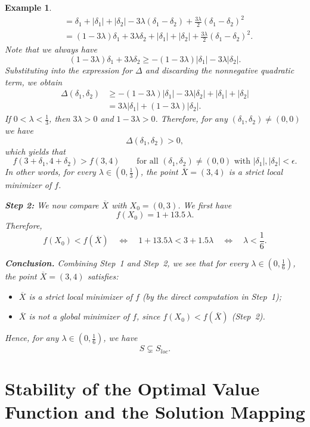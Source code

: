\documentclass[11pt]{article}
\newtheorem{example}[theorem]{Example}
\theoremstyle{definition}
\newcommand{\1}{\mathbf{1}}
\def\Bar{\overline}
\begin{document}
\begin{example}
{\[\begin{aligned}
&=\delta_1 + |\delta_1| + |\delta_2|
-3\lambda(\delta_1-\delta_2)
+\frac{3\lambda}{2}(\delta_1-\delta_2)^2\\
&=(1-3\lambda)\delta_1 + 3\lambda\delta_2
+|\delta_1|+|\delta_2|
+\frac{3\lambda}{2}(\delta_1-\delta_2)^2.
\end{aligned}\]
Note that we always have
\[
(1-3\lambda)\delta_1 + 3\lambda\delta_2
\ge
-(1-3\lambda)|\delta_1| - 3\lambda|\delta_2|.
\]
Substituting into the expression for $\Delta$ and discarding the nonnegative
quadratic term, we obtain
\[
\begin{aligned}
\Delta(\delta_1,\delta_2)
&\ge
-(1-3\lambda)|\delta_1| - 3\lambda|\delta_2|
+|\delta_1|+|\delta_2|\\
&=
3\lambda|\delta_1| + (1-3\lambda)|\delta_2|.
\end{aligned}
\]
If $0<\lambda<\tfrac13$, then $3\lambda>0$ and $1-3\lambda>0$. Therefore,
for any $(\delta_1,\delta_2)\ne(0,0)$ we have
\[
\Delta(\delta_1,\delta_2)>0,
\]
which yields that
\[
f(3+\delta_1,4+\delta_2)
>
f(3,4)
\qquad
\text{for all }(\delta_1,\delta_2)\ne(0,0)
\text{ with }|\delta_1|,|\delta_2|<\epsilon.
\]
In other words, for every $\lambda\in(0,\tfrac13)$, the point $\Bar X=(3,4)$
is a \emph{strict local minimizer} of $f$.

\medskip\noindent
\textbf{Step 2:}
We now compare $\Bar X$ with $X_0=(0,3)$. We first have
\[
f(X_0)=1+13.5\,\lambda.
\]
Therefore,
\[
f(X_0)<f(\Bar X)
\quad\Longleftrightarrow\quad
1+13.5\lambda<3+1.5\lambda
\quad\Longleftrightarrow\quad
\lambda<\frac{1}{6}.
\]

\medskip\noindent
\textbf{Conclusion.}
Combining Step~1 and Step~2, we see that for every $\lambda\in(0,\tfrac16)$,
the point $\Bar X=(3,4)$ satisfies:
\begin{itemize}
\item $\Bar X$ is a strict local minimizer of $f$ (by the direct
computation in Step~1);
\item $\Bar X$ is not a global minimizer of $f$, since
$f(X_0)<f(\Bar X)$ (Step~2).
\end{itemize}
Hence, for any $\lambda\in(0,\tfrac16)$, we have
\[
S\subsetneq S_{loc}.
\]}
\end{example}




\section{Stability of the Optimal Value Function and the Solution Mapping} \label{section3}
\end{document}

